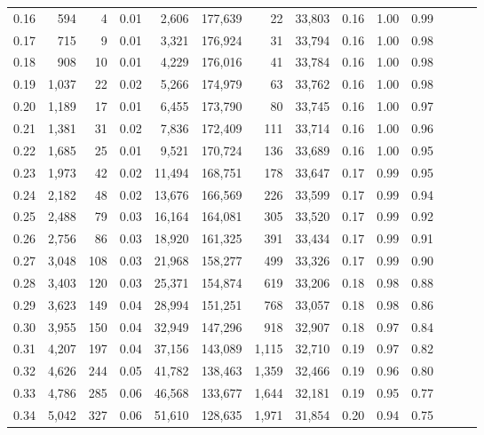 \begin{tabular}{rrrrrrrrrrrrrr}
0.16 &    594 &      4 &  0.01 &    2,606 &  177,639 &      22 &  33,803 &  0.16 &  1.00 &      0.99 \\
0.17 &    715 &      9 &  0.01 &    3,321 &  176,924 &      31 &  33,794 &  0.16 &  1.00 &      0.98 \\
0.18 &    908 &     10 &  0.01 &    4,229 &  176,016 &      41 &  33,784 &  0.16 &  1.00 &      0.98 \\
0.19 &  1,037 &     22 &  0.02 &    5,266 &  174,979 &      63 &  33,762 &  0.16 &  1.00 &      0.98 \\
0.20 &  1,189 &     17 &  0.01 &    6,455 &  173,790 &      80 &  33,745 &  0.16 &  1.00 &      0.97 \\
0.21 &  1,381 &     31 &  0.02 &    7,836 &  172,409 &     111 &  33,714 &  0.16 &  1.00 &      0.96 \\
0.22 &  1,685 &     25 &  0.01 &    9,521 &  170,724 &     136 &  33,689 &  0.16 &  1.00 &      0.95 \\
0.23 &  1,973 &     42 &  0.02 &   11,494 &  168,751 &     178 &  33,647 &  0.17 &  0.99 &      0.95 \\
0.24 &  2,182 &     48 &  0.02 &   13,676 &  166,569 &     226 &  33,599 &  0.17 &  0.99 &      0.94 \\
0.25 &  2,488 &     79 &  0.03 &   16,164 &  164,081 &     305 &  33,520 &  0.17 &  0.99 &      0.92 \\
0.26 &  2,756 &     86 &  0.03 &   18,920 &  161,325 &     391 &  33,434 &  0.17 &  0.99 &      0.91 \\
0.27 &  3,048 &    108 &  0.03 &   21,968 &  158,277 &     499 &  33,326 &  0.17 &  0.99 &      0.90 \\
0.28 &  3,403 &    120 &  0.03 &   25,371 &  154,874 &     619 &  33,206 &  0.18 &  0.98 &      0.88 \\
0.29 &  3,623 &    149 &  0.04 &   28,994 &  151,251 &     768 &  33,057 &  0.18 &  0.98 &      0.86 \\
0.30 &  3,955 &    150 &  0.04 &   32,949 &  147,296 &     918 &  32,907 &  0.18 &  0.97 &      0.84 \\
0.31 &  4,207 &    197 &  0.04 &   37,156 &  143,089 &   1,115 &  32,710 &  0.19 &  0.97 &      0.82 \\
0.32 &  4,626 &    244 &  0.05 &   41,782 &  138,463 &   1,359 &  32,466 &  0.19 &  0.96 &      0.80 \\
0.33 &  4,786 &    285 &  0.06 &   46,568 &  133,677 &   1,644 &  32,181 &  0.19 &  0.95 &      0.77 \\
0.34 &  5,042 &    327 &  0.06 &   51,610 &  128,635 &   1,971 &  31,854 &  0.20 &  0.94 &      0.75 \\

\end{tabular}
